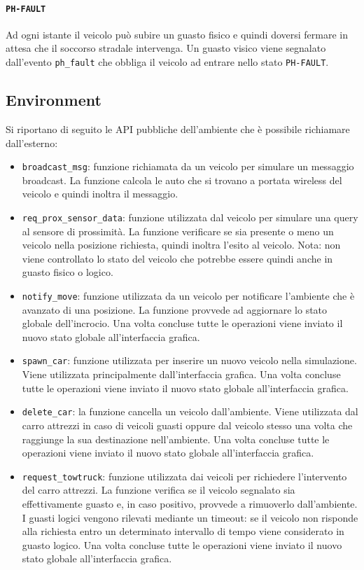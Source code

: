 \documentclass{memoir}
\begin{document}
\paragraph{\texttt{PH-FAULT}}
Ad ogni istante il veicolo può subire un guasto fisico e quindi doversi fermare
in attesa che il soccorso stradale intervenga. Un guasto visico viene segnalato
dall'evento \texttt{ph\_fault} che obbliga il veicolo ad entrare nello stato
\texttt{PH-FAULT}.


\subsection{Environment}

Si riportano di seguito le API pubbliche dell'ambiente che è possibile
richiamare dall'esterno:
\begin{itemize}
\item \texttt{broadcast\_msg}: funzione richiamata da un veicolo per simulare
  un messaggio broadcast. La funzione calcola le auto che si trovano a portata
  wireless del veicolo e quindi inoltra il messaggio.
\item \texttt{req\_prox\_sensor\_data}: funzione utilizzata dal veicolo per
  simulare una query al sensore di prossimità. La funzione verificare se sia
  presente o meno un veicolo nella posizione richiesta, quindi inoltra l'esito
  al veicolo. Nota: non viene controllato lo stato del veicolo che potrebbe
  essere quindi anche in guasto fisico o logico.
\item \texttt{notify\_move}: funzione utilizzata da un veicolo per notificare
  l'ambiente che è avanzato di una posizione. La funzione provvede ad aggiornare
  lo stato globale dell’incrocio. Una volta concluse tutte le operazioni viene
  inviato il nuovo stato globale all’interfaccia grafica.
\item \texttt{spawn\_car}: funzione utilizzata per inserire un nuovo veicolo
  nella simulazione. Viene utilizzata principalmente dall'interfaccia grafica.
  Una volta concluse tutte le operazioni viene inviato il nuovo stato globale
  all’interfaccia grafica.
\item \texttt{delete\_car}: la funzione cancella un veicolo dall'ambiente. Viene
  utilizzata dal carro attrezzi in caso di veicoli guasti oppure dal veicolo
  stesso una volta che raggiunge la sua destinazione nell’ambiente. Una volta
  concluse tutte le operazioni viene inviato il nuovo stato globale
  all’interfaccia grafica.
\item \texttt{request\_towtruck}: funzione utilizzata dai veicoli per richiedere
  l'intervento del carro attrezzi. La funzione verifica se il veicolo segnalato
  sia effettivamente guasto e, in caso positivo, provvede a rimuoverlo
  dall’ambiente. I guasti logici vengono rilevati mediante un timeout: se il
  veicolo non risponde alla richiesta entro un determinato intervallo di tempo
  viene considerato in guasto logico. Una volta concluse tutte le operazioni
  viene inviato il nuovo stato globale all’interfaccia grafica.
\end{itemize}
\end{document}
